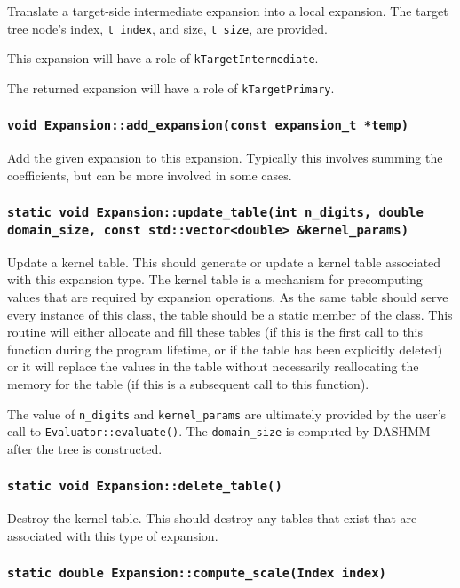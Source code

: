 Translate a target-side intermediate expansion into a local expansion. The
target tree node's index, \texttt{t\_index}, and size, \texttt{t\_size},
are provided.

This expansion will have a role of \texttt{kTargetIntermediate}.

The returned expansion will have a role of \texttt{kTargetPrimary}.

\subsubsection{\texttt{void Expansion::add\_expansion(const expansion\_t *temp)}}

Add the given expansion to this expansion. Typically this involves summing the
coefficients, but can be more involved in some cases.

\subsubsection{\texttt{static void Expansion::update\_table(int n\_digits, double domain\_size, const std::vector<double> \&kernel\_params)}}

Update a kernel table. This should generate or update a kernel table associated
with this expansion type. The kernel table is a mechanism for precomputing
values that are required by expansion operations. As the same table should
serve every instance of this class, the table should be a static member of the
class. This routine will either allocate and fill these tables (if this is the
first call to this function during the program lifetime, or if the table has
been explicitly deleted) or it will replace the values in the table without
necessarily reallocating the memory for the table (if this is a subsequent call
to this function).

The value of \texttt{n\_digits} and \texttt{kernel\_params} are ultimately
provided by the user's call to \texttt{Evaluator::evaluate()}. The
\texttt{domain\_size} is computed by DASHMM after the tree is constructed.

\subsubsection{\texttt{static void Expansion::delete\_table()}}

Destroy the kernel table. This should destroy any tables that exist that are
associated with this type of expansion.

\subsubsection{\texttt{static double Expansion::compute\_scale(Index index)}}

